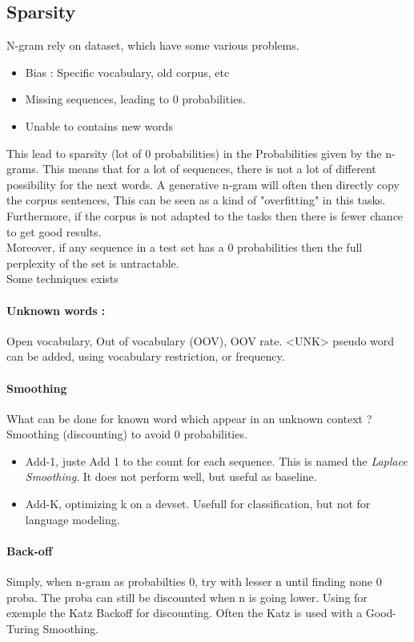 		\subsection{Sparsity}

			N-gram rely on dataset, which have some various problems.
			\begin{itemize}
				\item Bias : Specific vocabulary, old corpus, etc
				\item Missing sequences, leading to 0 probabilities.
				\item Unable to contains new words
			\end{itemize}
			This lead to sparsity (lot of 0 probabilities) in the Probabilities given by the n-grams. This means that for a lot of sequences, there is not a lot of different possibility for the next words. A generative n-gram will often then directly copy the corpus sentences, This can be seen as a kind of "overfitting" in this tasks. Furthermore, if the corpus is not adapted to the tasks then there is fewer chance to get good results.\\
			Moreover, if any sequence in a test set has a 0 probabilities then the full perplexity of the set is untractable.\\
			Some techniques exists 

			\paragraph*{Unknown words :} Open vocabulary, Out of vocabulary (OOV), OOV rate. <UNK> pseudo word can be added, using vocabulary restriction, or frequency.
			\paragraph*{Smoothing}
			What can be done for known word which appear in an unknown context ? Smoothing (discounting) to avoid 0 probabilities.
			\begin{itemize}
				\item Add-1, juste Add 1 to the count for each sequence. This is named the \emph{Laplace Smoothing}. It does not perform well, but useful as baseline.
				\item Add-K, optimizing k on a devset. Usefull for classification, but not for language modeling.
			\end{itemize}
			
			\paragraph*{Back-off}
				Simply, when n-gram as probabilties 0, try with lesser n until finding none 0 proba. The proba can still be discounted when n is going lower. Using for exemple the Katz Backoff for discounting. Often the Katz is used with a Good-Turing Smoothing.

